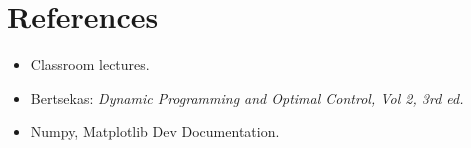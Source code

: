 \section{References}
\begin{itemize}
\item Classroom lectures.
\item Bertsekas:\textit{ Dynamic Programming and Optimal Control, Vol 2, 3rd ed.}
\item Numpy, Matplotlib Dev Documentation.
\end{itemize}

